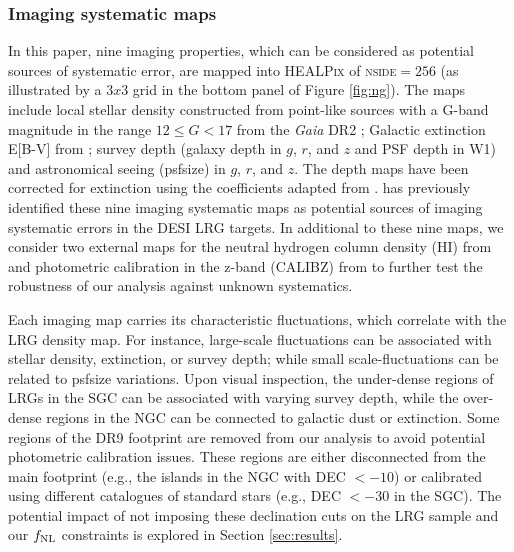\subsubsection{Imaging systematic maps}
In this paper, nine imaging properties, which can be considered as potential sources of systematic error, are mapped into \textsc{HEALPix} of \textsc{nside}$=256$ (as illustrated by a $3x3$ grid in the bottom panel of Figure \ref{fig:ng}). The maps include local stellar density constructed from point-like sources with a G-band magnitude in the range $12 \leq G < 17$ from the \textit{Gaia} DR2 \citep[see,][]{gaiadr2, myers2022}; Galactic extinction E[B-V] from \cite{schlegel1998maps}; survey depth (galaxy depth in $g$, $r$, and $z$ and PSF depth in W1) and astronomical seeing (psfsize) in $g$, $r$, and $z$. The depth maps have been corrected for extinction using the coefficients adapted from \cite{2011ApJ...737..103S}. \cite{zhou2022target} has previously identified these nine imaging systematic maps as potential sources of imaging systematic errors in the DESI LRG targets. In additional to these nine maps, we consider two external maps for the neutral hydrogen column density (HI) from \cite{2016A&A...594A.116H} and photometric calibration in the z-band (CALIBZ) from  to further test the robustness of our analysis against unknown systematics.

Each imaging map carries its characteristic fluctuations, which correlate with the LRG density map. For instance, large-scale fluctuations can be associated with stellar density, extinction, or survey depth; while small scale-fluctuations can be related to psfsize variations. Upon visual inspection, the under-dense regions of LRGs in the SGC can be associated with varying survey depth, while the over-dense regions in the NGC can be connected to galactic dust or extinction. Some regions of the DR9 footprint are removed from our analysis to avoid potential photometric calibration issues. These regions are either disconnected from the main footprint (e.g., the islands in the NGC with DEC $<-10$) or calibrated using different catalogues of standard stars (e.g., DEC $<-30$ in the SGC). The potential impact of not imposing these declination cuts on the LRG sample and our $f_{\rm NL}$ constraints is explored in Section \ref{sec:results}. 

